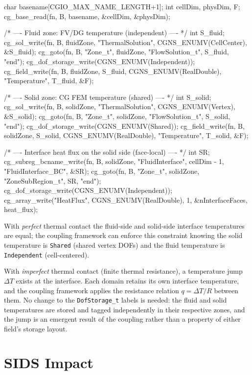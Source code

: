 \documentclass[11pt,letterpaper]{article}
\makeatletter
\let\cgns@orig@lstlisting\lstlisting
\let\cgns@endorig@lstlisting\endlstlisting
\renewenvironment{lstlisting}
  {\par\needspace{5\baselineskip}\nolinenumbers\cgns@orig@lstlisting}
  {\cgns@endorig@lstlisting\par\linenumbers}
\makeatother
\begin{document}
\begin{lstlisting}[language=C]
char basename[CGIO_MAX_NAME_LENGTH+1];
int cellDim, physDim, F;
cg_base_read(fn, B, basename, &cellDim, &physDim);

/* ---- Fluid zone: FV/DG temperature (independent) ---- */
int S_fluid;
cg_sol_write(fn, B, fluidZone, "ThermalSolution",
    CGNS_ENUMV(CellCenter), &S_fluid);
cg_goto(fn, B, "Zone_t", fluidZone,
    "FlowSolution_t", S_fluid, "end");
cg_dof_storage_write(CGNS_ENUMV(Independent));
cg_field_write(fn, B, fluidZone, S_fluid,
    CGNS_ENUMV(RealDouble), "Temperature", T_fluid, &F);

/* ---- Solid zone: CG FEM temperature (shared) ---- */
int S_solid;
cg_sol_write(fn, B, solidZone, "ThermalSolution",
    CGNS_ENUMV(Vertex), &S_solid);
cg_goto(fn, B, "Zone_t", solidZone,
    "FlowSolution_t", S_solid, "end");
cg_dof_storage_write(CGNS_ENUMV(Shared));
cg_field_write(fn, B, solidZone, S_solid,
    CGNS_ENUMV(RealDouble), "Temperature", T_solid, &F);

/* ---- Interface heat flux on the solid side (face-local) ---- */
int SR;
cg_subreg_bcname_write(fn, B, solidZone, "FluidInterface",
    cellDim - 1, "FluidInterface_BC", &SR);
cg_goto(fn, B, "Zone_t", solidZone,
    "ZoneSubRegion_t", SR, "end");
cg_dof_storage_write(CGNS_ENUMV(Independent));
cg_array_write("HeatFlux", CGNS_ENUMV(RealDouble),
    1, &nInterfaceFaces, heat_flux);
\end{lstlisting}

With \emph{perfect} thermal contact the fluid-side and solid-side
interface temperatures are equal; the coupling framework can enforce
this constraint knowing the solid temperature is
\texttt{Shared} (shared vertex DOFs) and the fluid
temperature is \texttt{Independent} (cell-centered).

With \emph{imperfect} thermal contact (finite thermal resistance),
a temperature jump $\Delta T$ exists at the interface.  Each domain
retains its own interface temperature, and the coupling framework
applies the resistance relation $q = \Delta T / R$ between them.
No change to the \texttt{DofStorage\_t} labels is needed:
the fluid and solid temperatures are stored and tagged independently
in their respective zones, and the jump is an emergent result of the
coupling rather than a property of either field's storage layout.

\section{SIDS Impact}
\label{sec:sids-impact}
\end{document}
